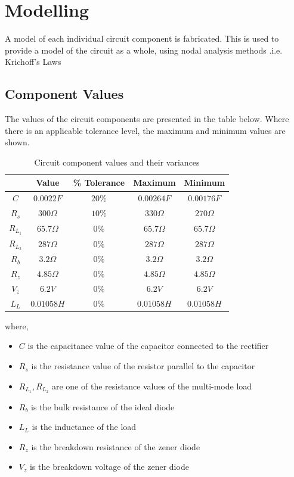\section{Modelling}
A model of each individual circuit component is fabricated. This is used to provide a model of the circuit as a whole, using nodal analysis methods .i.e. Krichoff's Laws

\subsection{Component Values}
The values of the circuit components are presented in the table below. Where there is an applicable tolerance level, the maximum and minimum values are shown. 
\begin{table}[H]
    \centering
    \begin{tabular}{|c|c|c||c|c|}\hline
        & Value & \% Tolerance & \textbf{Maximum} & \textbf{Minimum} \\\hline
       $C$ & $0.0022 F$ & $20\%$ & $0.00264F$ & $0.00176F$ \\
       $R_s$ & $300\Omega$ & $10\%$ & $330\Omega$ & $270\Omega$ \\
       $R_{L_1}$ & $65.7\Omega$ & $0\%$ & $65.7\Omega$  & $65.7\Omega$ \\
       $R_{L_2}$ & $287\Omega$ & $0\%$ & $287\Omega$ & $287\Omega$ \\
       $R_b$ & $3.2 \Omega$ & $0\%$ & $3.2 \Omega$ & $3.2 \Omega$ \\
       $R_z$ & $4.85 \Omega$ & $0\%$ & $4.85 \Omega$ & $4.85 \Omega$ \\
       $V_z$ & $6.2 V$ & $0\%$ & $6.2 V$ & $6.2 V$ \\
       $L_L$ & $0.01058 H$ & $0\%$ & $0.01058 H$ & $0.01058 H$ \\\hline
    \end{tabular}
    \caption{Circuit component values and their variances}
    \label{tab:component_values}
\end{table}
where,
\begin{itemize}
	\item $C$ is the capacitance value of the capacitor connected to the rectifier
	\item $R_s$ is the resistance value of the resistor parallel to the capacitor
	\item $R_{L_1}, R_{L_2}$ are one of the resistance values of the multi-mode load
	\item $R_b$ is the bulk resistance of the ideal diode
	\item $L_L$ is the inductance of the load
	\item $R_z$ is the breakdown resistance of the zener diode
	\item $V_z$ is the breakdown voltage of the zener diode
\end{itemize}

